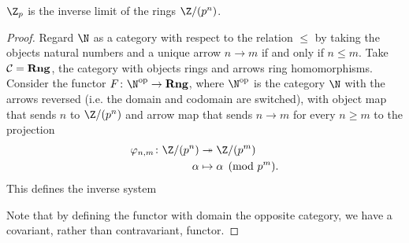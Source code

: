 \documentclass[10pt]{amsart}
\begin{document}
\begin{thm}\label{ex3}
  $\Z_p$ is the inverse limit of the rings $\Z/(p^n)$.
  \begin{proof}
    Regard $\N$ as a category with respect to the relation $\leq$ by taking the objects natural numbers and a unique arrow $n \rightarrow m$ if and only if $n \leq m$.
    Take $\mathcal{C} = {\bf Rng}$, the category with objects rings and arrows ring homomorphisms.
    Consider the functor $F \colon \N^\text{op} \rightarrow {\bf Rng}$, where $\N^\text{op}$ is the category $\N$ with the arrows reversed (i.e. the domain and codomain are switched), with object map that sends $n$ to $\Z/(p^n)$ and
    arrow map that sends $n \rightarrow m$ for every $n \geq m$ to the projection 
    \begin{align*}
      \varphi_{n,m} \colon \Z/(p^n) &\twoheadrightarrow \Z/(p^m)\\
      \alpha &\mapsto \alpha \pmod{p^m}.
    \end{align*}
    This defines the inverse system
    \begin{center}
    \end{center}
    Note that by defining the functor with domain the opposite category, we have a covariant, rather than contravariant, functor.
    

\end{proof}
\end{thm}
\end{document}
